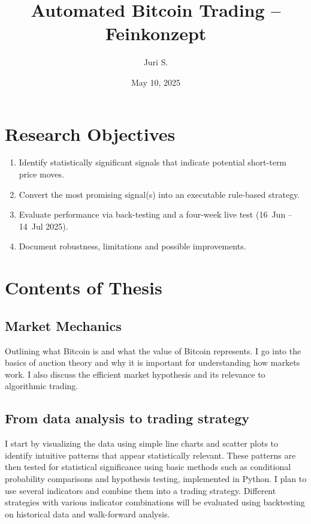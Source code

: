 \documentclass[12pt,a4paper]{article}
\title{Automated Bitcoin Trading – Feinkonzept}
\author{Juri S.}
\date{May 10, 2025}
\begin{document}
\maketitle
\tableofcontents
\newpage

\section{Research Objectives}
\begin{enumerate}
  \item Identify statistically significant signals that indicate potential short-term price moves.
  \item Convert the most promising signal(s) into an executable rule-based strategy.
  \item Evaluate performance via back-testing and a four-week live test (16~Jun – 14~Jul 2025).
  \item Document robustness, limitations and possible improvements.
\end{enumerate}

\section{Contents of Thesis}
\subsection{Market Mechanics}
Outlining what Bitcoin is and what the value of Bitcoin represents. I go into the basics of auction theory and why it is important for understanding
how markets work. I also discuss the efficient market hypothesis and its
relevance to algorithmic trading.

\subsection{From data analysis to trading strategy}
I start by visualizing the data using simple line charts and scatter plots to identify intuitive patterns that appear statistically relevant.
These patterns are then tested for statistical significance using basic methods such as conditional probability comparisons and hypothesis testing, implemented in Python.
I plan to use several indicators and combine them into a trading strategy. 
Different strategies with various indicator combinations will be evaluated using backtesting on historical data and walk-forward analysis.


\end{document}
